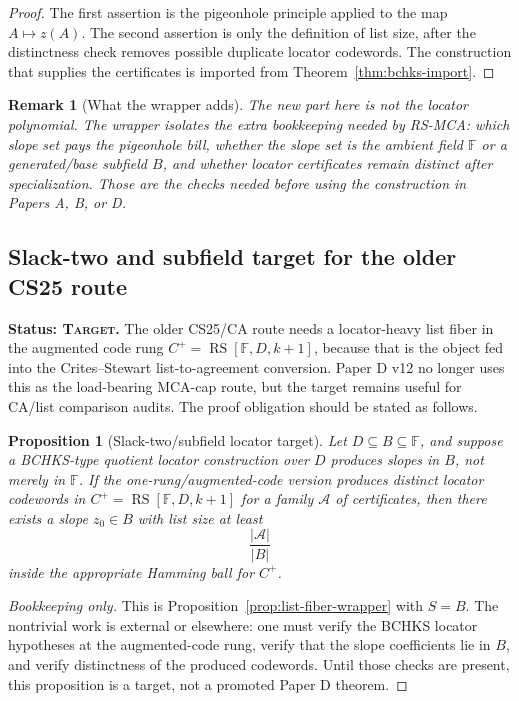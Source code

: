 \documentclass[11pt]{article}
\newtheorem{proposition}{Proposition}
\newtheorem{remark}{Remark}
\newcommand{\F}{\mathbb F}
\newcommand{\RS}{\operatorname{RS}}
\begin{document}
\begin{proof}
The first assertion is the pigeonhole principle applied to the map
\(A\mapsto z(A)\).  The second assertion is only the definition of list size,
after the distinctness check removes possible duplicate locator codewords.
The construction that supplies the certificates is imported from
Theorem~\ref{thm:bchks-import}.
\end{proof}

\begin{remark}[What the wrapper adds]
The new part here is not the locator polynomial.  The wrapper isolates the
extra bookkeeping needed by RS-MCA: which slope set pays the pigeonhole bill,
whether the slope set is the ambient field \(\F\) or a generated/base subfield
\(B\), and whether locator certificates remain distinct after specialization.
Those are the checks needed before using the construction in Papers A, B, or D.
\end{remark}

\subsection{Slack-two and subfield target for the older CS25 route}

\textbf{Status: \textsc{Target}.}
The older CS25/CA route needs a locator-heavy list fiber in the augmented code
rung \(C^+=\RS[\F,D,k+1]\), because that is the object fed into the
Crites--Stewart list-to-agreement conversion.  Paper D v12 no longer uses this
as the load-bearing MCA-cap route, but the target remains useful for CA/list
comparison audits.  The proof obligation should be stated as follows.

\begin{proposition}[Slack-two/subfield locator target]
\label{prop:slack-two-target}
Let \(D\subseteq B\subseteq\F\), and suppose a BCHKS-type quotient locator
construction over \(D\) produces slopes in \(B\), not merely in \(\F\).  If the
one-rung/augmented-code version produces distinct locator codewords in
\(C^+=\RS[\F,D,k+1]\) for a family \(\mathcal A\) of certificates, then there
exists a slope \(z_0\in B\) with list size at least
\[
  \frac{|\mathcal A|}{|B|}
\]
inside the appropriate Hamming ball for \(C^+\).
\end{proposition}

\begin{proof}[Bookkeeping only]
This is Proposition~\ref{prop:list-fiber-wrapper} with \(S=B\).  The nontrivial
work is external or elsewhere: one must verify the BCHKS locator hypotheses at
the augmented-code rung, verify that the slope coefficients lie in \(B\), and
verify distinctness of the produced codewords.  Until those checks are present,
this proposition is a target, not a promoted Paper D theorem.
\end{proof}
\end{document}
